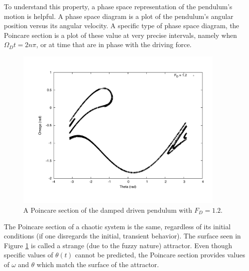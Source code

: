 \documentclass[12pt]{article}
\begin{document}
To understand this property, a phase space representation of the pendulum's motion is helpful.  A phase space diagram is a plot of the pendulum's angular position versus its angular velocity.  A specific type of phase space diagram, the Poincare section is a plot of these value at very precise intervals, namely when $\Omega_D t = 2n\pi$, or at time that are in phase with the driving force.
\begin{figure}[!h]
\centering
\includegraphics[width =120 mm, height = 80mm]{Fig_3_9.pdf}
\caption{A Poincare section of the damped driven pendulum with $F_D = 1.2$.}
\label{fig:3_9}
\end{figure}

The Poincare section of a chaotic system is the same, regardless of its initial conditions (if one disregards the initial, transient behavior).  The surface seen in Figure \ref{fig:3_9} is called a strange (due to the fuzzy nature) attractor.  Even though specific values of $\theta(t)$ cannot be predicted, the Poincare section provides values of $\omega$ and $\theta$ which match the surface of the attractor.
\end{document}
